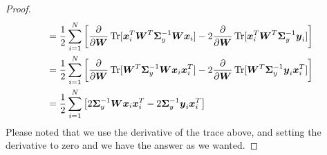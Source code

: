 \begin{proof}
\begin{align*}
        &= \frac{1}{2}\sum^N_{i=1}\left[  \frac{\partial}{\partial \boldsymbol W}\operatorname{Tr}[\boldsymbol x_i^T\boldsymbol W^T\boldsymbol \Sigma_y^{-1}\boldsymbol W\boldsymbol x_i] - 2\frac{\partial}{\partial \boldsymbol W}\operatorname{Tr}[\boldsymbol x_i^T\boldsymbol W^T\boldsymbol \Sigma_y^{-1}\boldsymbol y_i]  \right] \\
        &= \frac{1}{2}\sum^N_{i=1}\left[  \frac{\partial}{\partial \boldsymbol W}\operatorname{Tr}[\boldsymbol W^T\boldsymbol \Sigma_y^{-1}\boldsymbol W\boldsymbol x_i\boldsymbol x_i^T] - 2\frac{\partial}{\partial \boldsymbol W}\operatorname{Tr}[\boldsymbol W^T\boldsymbol \Sigma_y^{-1}\boldsymbol y_i\boldsymbol x_i^T]  \right] \\
        &= \frac{1}{2}\sum^N_{i=1}\left[   2\boldsymbol\Sigma_y^{-1}\boldsymbol W\boldsymbol x_i\boldsymbol x_i^T - 2\boldsymbol \Sigma_y^{-1}\boldsymbol y_i\boldsymbol x_i^T  \right] \\
    \end{align*}
    Please noted that we use the derivative of the trace above, and setting the derivative to zero and we have the answer as we wanted. 
\end{proof}

